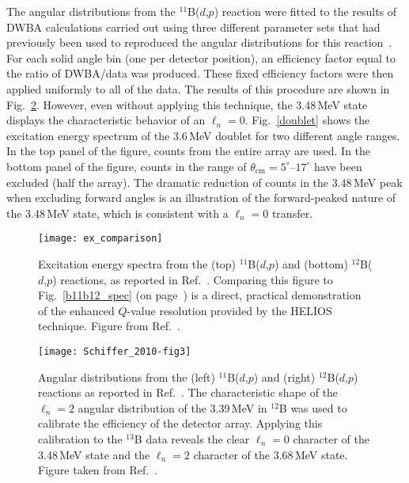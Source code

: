 The angular distributions from the $^{11}$B($d$,$p$) reaction were fitted to the results of DWBA calculations carried out using three different parameter sets that had previously been used to reproduced the angular distributions for this reaction~\cite{Perey_1963, Schiffer_1967, Corrigan_1972}.  For each solid angle bin (one per detector position), an efficiency factor equal to the ratio of DWBA/data was produced.  These fixed efficiency factors were then applied uniformly to all of the data.  The results of this procedure are shown in Fig.~\ref{b12angdist}.  However, even without applying this technique, the 3.48\,MeV state displays the characteristic behavior of an $\ell_n=0$.  Fig.~\ref{doublet} shows the excitation energy spectrum of the 3.6\,MeV doublet for two different angle ranges.  In the top panel of the figure, counts from the entire array are used.  In the bottom panel of the figure, counts in the range of $\theta_\mathrm{cm}=5^\circ$--$17^\circ$ have been excluded (half the array).  The dramatic reduction of counts in the 3.48\,MeV peak when excluding forward angles is an illustration of the forward-peaked nature of the 3.48\,MeV state, which is consistent with a $\ell_n=0$ transfer.

\begin{figure}%
\centering
\texttt{[image: ex\_comparison]}%
\caption[Excitation energy spectra from the $^{11,12}$B($d$,$p$) reactions]{Excitation energy spectra from the (top) $^{11}$B($d$,$p$) and (bottom) $^{12}$B($d$,$p$) reactions, as reported in Ref.~\cite{Schiffer_2010}. Comparing this figure to Fig.~\ref{b11b12_spec} (on page~\pageref{b11b12_spec}) is a direct, practical demonstration of the enhanced $Q$-value resolution provided by the HELIOS technique.  Figure from Ref.~\cite{Wuosmaa_2011PC}.}%
\label{b11b12_spec_helios}%
\end{figure}

\pagebreak

\begin{figure}
\centering
\texttt{[image: Schiffer\_2010-fig3]}%
\caption[Angular distributions from the $^{11,12}$B($d$,$p$) reactions]{Angular distributions from the (left) $^{11}$B($d$,$p$) and (right) $^{12}$B($d$,$p$) reactions as reported in Ref.~\cite{Schiffer_2010}.  The characteristic shape of the $\ell_n=2$ angular distribution of the 3.39\,MeV in $^{12}$B was used to calibrate the efficiency of the detector array.  Applying this calibration to the $^{13}$B data reveals the clear $\ell_n=0$ character of the 3.48\,MeV state and the $\ell_n=2$ character of the 3.68\,MeV state.  Figure taken from Ref.~\cite[Fig.~3]{Schiffer_2010}.}%
\label{b12angdist}%
\end{figure}

